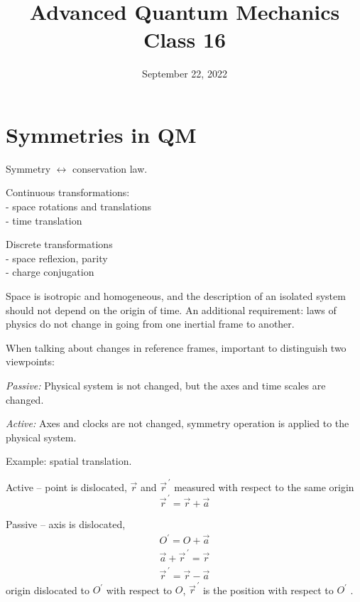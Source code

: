 \documentclass[12pt]{article}
\title{Advanced Quantum Mechanics\\Class 16}
\date{September 22, 2022}                                           %
\newcommand{\be}{\begin{equation}}
\newcommand{\ee}{\end{equation}}
\begin{document}
\maketitle


\section{Symmetries in QM}

Symmetry \(\longleftrightarrow\) conservation law.

Continuous transformations:\\
- space rotations and translations\\
- time translation

Discrete transformations\\
- space reflexion, parity\\
- charge conjugation

Space is isotropic and homogeneous, and
the description of an isolated system should not
depend on the origin of time.
An additional requirement: laws of physics do not
change in going from one inertial frame to another.

When talking about changes in reference frames,
important to distinguish two viewpoints:

\emph{Passive:}
Physical system is not
changed, but the axes
and time scales are
changed.

\emph{Active:}
Axes and clocks are not
changed, symmetry operation
is applied to the physical
system.

Example: spatial translation.

Active -- point is dislocated, \(\vec{r}\) and \(\vec{r}^{\,\prime}\) measured
with respect to the same origin
\be
\vec{r}^{\,\prime}=\vec{r}+\vec{a}
\ee


Passive -- axis is dislocated,
\be
\begin{array}{l}O^{\prime}=O+\vec{a} \\ 
\vec{a}+\vec{r}^{\,\prime}=\vec{r} \\ 
\boxed{
\vec{r}^{\,\prime}=\vec{r}-\vec{a}
}\end{array}	
\ee
origin dislocated to \(O^{\prime}\) with respect to \(O\),
\(\vec{r}^{\,\prime}\) is the position with respect to \(O^{\prime}\) .
\end{document}
